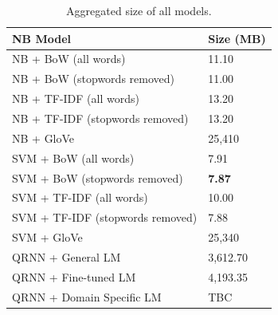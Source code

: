 \documentclass[a4paper,twoside,phd]{BYUPhys}
\begin{document}
\begin{table}[H]
	\centering
	
	\begin{tabular}{|p{4.2cm}|p{5cm}|}
		\hline
		
		\textbf{NB Model} & \textbf{Size (MB)}                                                                                                                                                                                                                                                                                                                                                    \\
		\hline                                                                                                                                              
		
		NB + BoW (all words)  & 11.10  \\
		\hline
		
		NB + BoW \newline (stopwords  removed)  & 11.00 \\
		\hline
		
		NB + TF-IDF \newline (all words) & 13.20 \\
		\hline
		
		NB + TF-IDF \newline (stopwords removed) & 13.20 \\
		\hline
		
		NB + GloVe & 25,410 \\
		\hline
		
		SVM + BoW  (all words)  & 7.91  \\
		\hline
		
		SVM + BoW \newline (stopwords removed)  & \textbf{7.87}  \\
		\hline
		
		SVM + TF-IDF \newline (all words) & 10.00 \\
		\hline
		
		SVM + TF-IDF \newline (stopwords removed) & 7.88 \\
		\hline
		
		SVM + GloVe & 25,340 \\
		\hline
		
		QRNN + \newline General LM  & 3,612.70  \\
		\hline
		
		QRNN + \newline Fine-tuned LM  & 4,193.35  \\
		\hline
		
		QRNN + \newline Domain Specific LM & TBC \\
		\hline
		
		
	\end{tabular}
	\caption{Aggregated size of all models.}
	\label{table:NBStorageRequirements}
\end{table}
\end{document}
